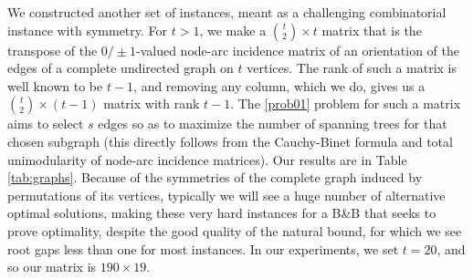 \documentclass[smallextended]{svjour3hack}       %
\begin{document}
We constructed another set of instances, meant as a challenging combinatorial instance with symmetry.
For $t>1$, we make a $\binom{t}{2}\times t$ matrix that is the transpose of the $0/\pm1$-valued node-arc incidence matrix of an orientation of the edges of a complete undirected graph on $t$ vertices. 
The rank of such a matrix is well known to be $t-1$, and removing any column, which we do,
gives us a $\binom{t}{2}\times (t-1)$ 
matrix with rank $t-1$. The \ref{prob01} problem for such a matrix aims to select $s$ edges so as to maximize the number of spanning trees for that chosen subgraph
(this directly follows from the Cauchy-Binet formula and total unimodularity of node-arc incidence matrices). Our results are in Table \ref{tab:graphs}.
Because of the symmetries of the complete graph induced by permutations of its vertices, 
typically we will see a huge number of alternative optimal solutions, making these very hard instances for a B\&B that seeks to prove optimality, despite the good quality of the natural bound, for which we see root gaps less than one for most instances. In our experiments, we set $t=20$, and so our matrix is 
$190\times 19$. 
\end{document}
